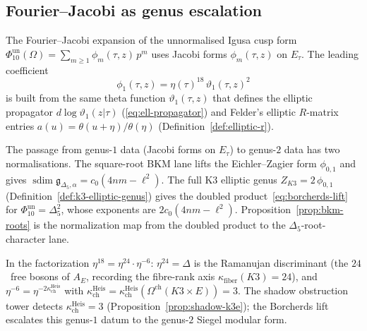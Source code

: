 \subsection{Fourier--Jacobi as genus escalation}
\label{subsec:bridge-fourier-jacobi}

\begin{proposition}
\label{prop:bridge-fj-genus-escalation}
The Fourier--Jacobi expansion of the unnormalised Igusa cusp form
\(\Phi_{10}^{\mathrm{un}}(\Omega)
= \sum_{m \geq 1} \phi_m(\tau,z)\,p^m\)
uses Jacobi forms $\phi_m(\tau,z)$ on $E_\tau$. The leading
coefficient
\begin{equation}\label{eq:bridge-phi-1}
\phi_1(\tau,z) = \eta(\tau)^{18}\,\vartheta_1(\tau,z)^2
\end{equation}
is built from the same theta function $\vartheta_1(\tau,z)$ that defines the
elliptic propagator $d\log\vartheta_1(z|\tau)$
\textup{(}\eqref{eq:ell-propagator}\textup{)} and
Felder's elliptic $R$-matrix entries $a(u) = \theta(u{+}\eta)/\theta(\eta)$
\textup{(}Definition~\textup{\ref{def:elliptic-r})}.

The passage from genus-$1$ data \textup{(}Jacobi forms on $E_\tau$\textup{)}
to genus-$2$ data has two normalisations. The square-root BKM lane lifts
the Eichler--Zagier form \(\phi_{0,1}\) and gives
\(\operatorname{sdim}\mathfrak g_{\Delta_5,\alpha}
=c_0(4nm-\ell^2)\). The full K3 elliptic genus
\(Z_{K3}=2\,\phi_{0,1}\)
\textup{(}Definition~\textup{\ref{def:k3-elliptic-genus})} gives the
doubled product~\eqref{eq:borcherds-lift} for
\(\Phi_{10}^{\mathrm{un}}=\Delta_5^2\), whose exponents are
\(2c_0(4nm-\ell^2)\). Proposition~\textup{\ref{prop:bkm-roots}}
is the normalization map from the doubled product to the
\(\Delta_5\)-root-character lane.

In the factorization $\eta^{18} = \eta^{24} \cdot \eta^{-6}$:
$\eta^{24} = \Delta$ is the Ramanujan discriminant
\textup{(}the $24$~free bosons of $A_E$, recording the fibre-rank axis
$\kappa_{\mathrm{fiber}}(K3)=24$\textup{)}, and
$\eta^{-6} = \eta^{-2\kappa_{\mathrm{ch}}^{\mathrm{Heis}}}$ with $\kappa_{\mathrm{ch}}^{\mathrm{Heis}} = \kappa_{\mathrm{ch}}^{\mathrm{Heis}}(\Omega^{\mathrm{ch}}(K3 \times E))
= 3$. The shadow obstruction tower detects $\kappa_{\mathrm{ch}}^{\mathrm{Heis}} = 3$
\textup{(}Proposition~\textup{\ref{prop:shadow-k3e})};
the Borcherds lift escalates this genus-$1$ datum to the genus-$2$ Siegel modular form.
\end{proposition}


